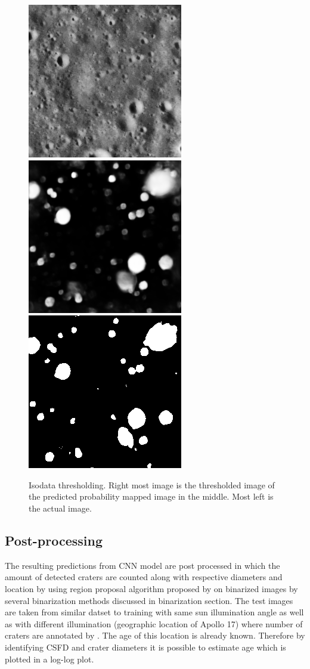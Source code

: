 \documentclass[11pt]{article}
\begin{document}
\begin{figure}[H]
	\includegraphics[width=.3\textwidth]{files/results/26.png}\hfill	
	\includegraphics[width=.3\textwidth]{files/results/26_predict.png}\hfill
	\includegraphics[width=.3\textwidth]{files/results/isodata.png}\hfill
	\caption{Isodata thresholding. Right most image is the thresholded image of the predicted probability mapped image in the middle. Most left is the actual image.}
	\label{isodata thresholding}
\end{figure}

\subsection{Post-processing}
The resulting predictions from CNN model are post processed in which the amount of detected craters are counted along with respective diameters and location by using region proposal algorithm proposed by \cite{burger2009principles} on binarized images by several binarization methods discussed in binarization section. The test images are taken from similar datset to training with same sun illumination angle as well as with different illumination (geographic location of Apollo 17) where number of craters are annotated by \cite{dino2020}. The age of this location is already known. Therefore by identifying CSFD and crater diameters it is possible to estimate age which is plotted in a log-log plot.
\end{document}
